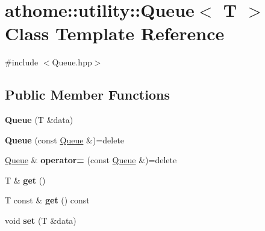 \hypertarget{classathome_1_1utility_1_1_queue}{}\section{athome\+:\+:utility\+:\+:Queue$<$ T $>$ Class Template Reference}
\label{classathome_1_1utility_1_1_queue}


{\ttfamily \#include $<$Queue.\+hpp$>$}

\subsection*{Public Member Functions}
\begin{DoxyCompactItemize}
\item 
\mbox{\label{classathome_1_1utility_1_1_queue_a1e600c60121fa653363e98634faf074b}} 
{\bfseries Queue} (T \&data)
\item 
\mbox{\label{classathome_1_1utility_1_1_queue_a1242a9ec752f798978088c588eb5c8d1}} 
{\bfseries Queue} (const \mbox{\hyperlink{classathome_1_1utility_1_1_queue}{Queue}} \&)=delete
\item 
\mbox{\label{classathome_1_1utility_1_1_queue_ac1dd0147e8ecb3e64f611a171a03befd}} 
\mbox{\hyperlink{classathome_1_1utility_1_1_queue}{Queue}} \& {\bfseries operator=} (const \mbox{\hyperlink{classathome_1_1utility_1_1_queue}{Queue}} \&)=delete
\item 
\mbox{\label{classathome_1_1utility_1_1_queue_ab2cccd2d9bdca5ef034d701632c36c14}} 
T \& {\bfseries get} ()
\item 
\mbox{\label{classathome_1_1utility_1_1_queue_ac4ab8a4da276687e290e4bd63191b946}} 
T const  \& {\bfseries get} () const
\item 
\mbox{\label{classathome_1_1utility_1_1_queue_a626427f94f7fc16dc4799d88b525bed2}} 
void {\bfseries set} (T \&data)
\item 
\mbox{\label{classathome_1_1utility_1_1_queue_acc8f39b5e5f61a1766fb8e0b6c17a6bd}} 

\end{DoxyCompactItemize}
